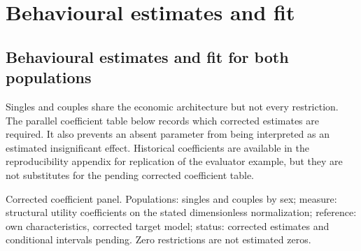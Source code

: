 \documentclass[11pt,a4paper]{article}
\begin{document}
\section{Behavioural estimates and fit}\label{behavioural-estimates-and-fit}

\subsection{Behavioural estimates and fit for both populations}\label{behavioural-estimates-and-fit-for-both-populations}

Singles and couples share the economic architecture but not every restriction. The parallel coefficient table below records which corrected estimates are required. It also prevents an absent parameter from being interpreted as an estimated insignificant effect. Historical coefficients are available in the reproducibility appendix for replication of the evaluator example, but they are not substitutes for the pending corrected coefficient table.

Corrected coefficient panel. Populations: singles and couples by sex; measure: structural utility coefficients on the stated dimensionless normalization; reference: own characteristics, corrected target model; status: corrected estimates and conditional intervals pending. Zero restrictions are not estimated zeros.
\end{document}
